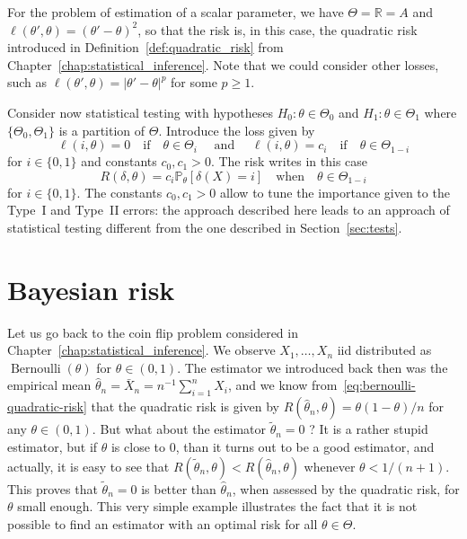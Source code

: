 \documentclass[
	fontsize=11pt, %
	twoside=false, %
	numbers=noenddot, %
]{kaobook}
\DeclareMathOperator{\ber}{Bernoulli}
\renewcommand{\P}{\mathbb P}
\newcommand{\R}{\mathbb R}
\newcommand{\wh}{\widehat}
\newcommand{\wt}{\widetilde}
\begin{document}
For the problem of estimation of a scalar parameter, we have $\Theta = \R = A$ and $\ell(\theta', \theta) = (\theta' - \theta)^2$, so that the risk is, in this case, the quadratic risk introduced in Definition~\ref{def:quadratic_risk} from Chapter~\ref{chap:statistical_inference}.
Note that we could consider other losses, such as $\ell(\theta', \theta) = |\theta' - \theta|^p$ for some $p \geq 1$.


Consider now statistical testing with hypotheses $H_0 : \theta \in \Theta_0$ and $H_1 : \theta \in \Theta_1$ where $\{ \Theta_0, \Theta_1 \}$ is a partition of $\Theta$.
Introduce the loss given by
\begin{equation}
	\label{eq:bayes-test-loss}
	\ell(i, \theta) = 0	\quad \text{if} \quad \theta \in \Theta_i \quad \text{ and } \quad \ell(i, \theta) = c_i \quad \text{if} \quad \theta \in \Theta_{1 - i}
\end{equation}
for $i \in \{ 0, 1 \}$ and constants $c_0, c_1 > 0$.
The risk writes in this case
\begin{equation*}
	R(\delta, \theta) =	c_i \P_\theta [\delta(X) = i] \quad \text{when} 
	\quad \theta \in \Theta_{1 - i}
\end{equation*}
for $i \in \{ 0, 1 \}$.
The constants $c_0, c_1 > 0$ allow to tune the importance given to the Type~I and Type~II errors: the approach described here leads to an approach of statistical testing different from the one described in Section~\ref{sec:tests}.


\section{Bayesian risk} %
\label{sec:bayesian-risk}

Let us go back to the coin flip problem considered in Chapter~\ref{chap:statistical_inference}.
We observe $X_1, \ldots, X_n$ iid distributed as $\ber(\theta)$ for $\theta \in (0, 1)$.
The estimator we introduced back then was the empirical mean $\wh \theta_n = \bar X_n = n^{-1} \sum_{i=1}^n X_i$, and we know from~\eqref{eq:bernoulli-quadratic-risk} that the quadratic risk is given by $R(\wh \theta_n, \theta) = \theta (1 - \theta) / n$ for any $\theta \in (0, 1)$.
But what about the estimator $\wt \theta_n = 0$ ? It is a rather stupid estimator, but if $\theta$ is close to $0$, than it turns out to be a good estimator, and actually, it is easy to see that
$R(\wt \theta_n, \theta) < R(\wh \theta_n, \theta)$ whenever $\theta < 1 / (n + 1)$.
This proves that $\wt \theta_n = 0$ is better than $\wh \theta_n$, when assessed by the quadratic risk, for $\theta$ small enough.%
This very simple example illustrates the fact that it is not possible to find an estimator with an optimal risk for all $\theta \in \Theta$.
\end{document}
